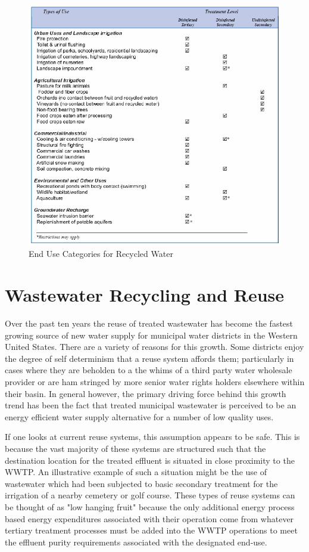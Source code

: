      \begin{figure}[!h]
       \centering
       \includegraphics[width=5.5in]{figures/use-categories.png}
       \caption[End Use Categories for Recycled Water]{End Use Categories for Recycled Water}
       \label{fig:use-categories}
     \end{figure}
     
\section{Wastewater Recycling and Reuse}
    
Over the past ten years the reuse of treated wastewater has become the fastest growing source of new water supply for municipal water districts in the Western United States. There are a variety of reasons for this growth. Some districts enjoy the degree of self determinism that a reuse system affords them; particularly in cases where they are beholden to a the whims of a third party water wholesale provider or are ham stringed by more senior water rights holders elsewhere within their basin. In general however, the primary driving force behind this growth trend has been the fact that treated municipal wastewater is perceived to be an energy efficient water supply alternative for a number of low quality uses.

If one looks at current reuse systems, this assumption appears to be safe. This is because the vast majority of these systems are structured such that the destination location for the treated effluent is situated in close proximity to the WWTP. An illustrative example of such a situation might be the use of wastewater which had been subjected to basic secondary treatment for the irrigation of a nearby cemetery or golf course. These types of reuse systems can be thought of as "low hanging fruit" because the only additional energy process based energy expenditures associated with their operation come from whatever tertiary treatment processes must be added into the WWTP operations to meet the effluent purity requirements associated with the designated end-use. 

